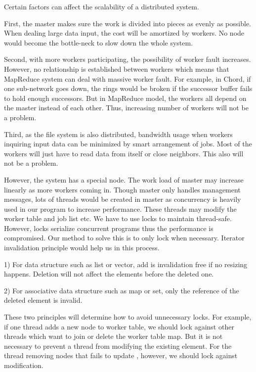 \documentclass[12pt]{article}
\begin{document}
Certain factors can affect the scalability of a distributed system.
 
First, the master makes sure the work is divided into pieces as evenly as possible. When dealing large data input, the cost will be amortized by
workers. No node would become the bottle-neck to slow down the whole system.
 
Second, with more workers participating, the possibility of worker fault increases. However, no relationship is established between workers which means that MapReduce system can deal with massive worker fault. For example, in Chord, if one sub-network goes down, the rings would be broken if the successor buffer fails to hold enough successors. But in MapReduce model, the workers all depend on the master instead of each other. Thus, increasing number of workers will not be a problem.

Third, as the file system is also distributed, bandwidth usage when workers inquiring input data can be minimized by smart arrangement of jobs. Most of the workers will just have to read data from itself or close neighbors. This also will not be a problem. 

However, the system has a special node. The work load of master may increase linearly as more workers coming in. Though master only handles management messages, lots of threads would be created in master as concurrency is heavily used in our program to increase performance. These threads may modify the worker table and job list etc. We have to use locks to maintain thread-safe. However, locks serialize concurrent programs thus the performance is compromised. Our method to solve this is to only lock when necessary. Iterator invalidation principle would help us in this process.

1) For data structure such as list or vector, add is invalidation free if no resizing happens. Deletion will not affect the elements before the deleted one.

2) For associative data structure such as map or set, only the reference of the deleted element is invalid.

These two principles will determine how to avoid unnecessary locks. For example, if one thread adds a new node to worker table, we should lock against other threads which want to join or delete the worker table map. But it is not necessary to prevent a thread from modifying the existing element. For the thread removing nodes that fails to update , however, we should lock against modification.        
   
\end{document}
